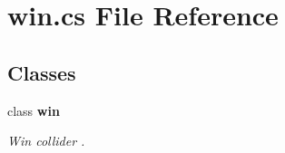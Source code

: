 \section{win.\+cs File Reference}
\label{win_8cs}
\subsection*{Classes}
\begin{DoxyCompactItemize}
\item 
class {\bf win}
\begin{DoxyCompactList}\small\item\em Win collider . \end{DoxyCompactList}\end{DoxyCompactItemize}
